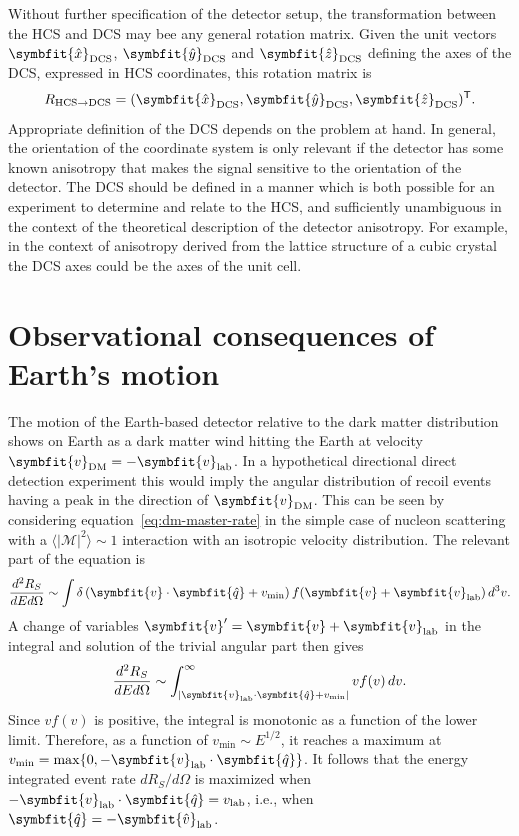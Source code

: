 \documentclass[b5paper, 10pt, twoside]{book}
\renewcommand{\vec}[1]{\symbfit{#1}}
\newcommand{\ddder}[3]{\frac{d^2#1}{d#2d#3}}
\newcommand{\unitv}[1]{\symbfit{\hat{#1}}}
\newcommand{\difd}{\,d}
\newcommand{\tmean}[1]{\langle#1\rangle}
\newcommand{\transp}{\mathsf{T}}
\begin{document}
Without further specification of the detector setup, the transformation between the HCS and DCS may bee any general rotation matrix. Given the unit vectors $\unitv{x}_\text{DCS}$, $\unitv{y}_\text{DCS}$ and $\unitv{z}_\text{DCS}$ defining the axes of the DCS, expressed in HCS coordinates, this rotation matrix is
\begin{equation}
R_{\text{HCS}\rightarrow\text{DCS}}=
(
\unitv{x}_\text{DCS},
\unitv{y}_\text{DCS},
\unitv{z}_\text{DCS}
)^\transp.
\end{equation}
Appropriate definition of the DCS depends on the problem at hand. In general, the orientation of the coordinate system is only relevant if the detector has some known anisotropy that makes the signal sensitive to the orientation of the detector. The DCS should be defined in a manner which is both possible for an experiment to determine and relate to the HCS, and sufficiently unambiguous in the context of the theoretical description of the detector anisotropy. For example, in the context of anisotropy derived from the lattice structure of a cubic crystal the DCS axes could be the axes of the unit cell.

\section{Observational consequences of Earth's motion}

The motion of the Earth-based detector relative to the dark matter distribution shows on Earth as a dark matter wind hitting the Earth at velocity $\vec{v}_\text{DM}=-\vec{v}_\text{lab}$. In a hypothetical directional direct detection experiment this would imply the angular distribution of recoil events having a peak in the direction of $\vec{v}_\text{DM}$. This can be seen by considering equation~\eqref{eq:dm-master-rate} in the simple case of nucleon scattering with a $\tmean{|\mathcal{M}|^2}\sim 1$ interaction with an isotropic velocity distribution. The relevant part of the equation is
\begin{equation}
\ddder{R_S}{E}{\Omega}\sim\int\delta\left(\vec{v}\cdot\unitv{q}+v_\text{min}\right)f(\vec{v}+\vec{v}_\text{lab})\difd^3v.
\end{equation}
A change of variables $\vec{v}'=\vec{v}+\vec{v}_\text{lab}$ in the integral and solution of the trivial angular part then gives
\begin{equation}
\ddder{R_S}{E}{\Omega}\sim\int_{|\vec{v}_\text{lab}\cdot\unitv{q}+v_\text{min}|}^\infty vf(v)\difd v.
\label{eq:isotropic-rate}
\end{equation}
Since $vf(v)$ is positive, the integral is monotonic as a function of the lower limit. Therefore, as a function of $v_\text{min}\sim E^{1/2}$, it reaches a maximum at $v_\text{min}=\max\{0,-\vec{v}_\text{lab}\cdot\unitv{q}\}$. It follows that the energy integrated event rate $dR_S/d\Omega$ is maximized when $-\vec{v}_\text{lab}\cdot\unitv{q}=v_\text{lab}$, i.e., when $\unitv{q}=-\unitv{v}_\text{lab}$.
\end{document}
